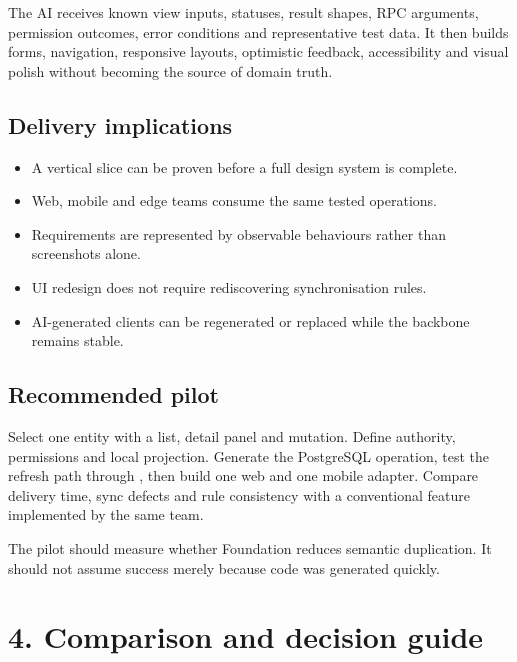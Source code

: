 \documentclass[10pt]{article}
\begin{document}
The AI receives known view inputs, statuses, result shapes, RPC arguments, permission outcomes, error conditions and representative test data. It then builds forms, navigation, responsive layouts, optimistic feedback, accessibility and visual polish without becoming the source of domain truth.

\subsection{Delivery implications}

\begin{itemize}
  \item A vertical slice can be proven before a full design system is complete.
  \item Web, mobile and edge teams consume the same tested operations.
  \item Requirements are represented by observable behaviours rather than screenshots alone.
  \item UI redesign does not require rediscovering synchronisation rules.
  \item AI-generated clients can be regenerated or replaced while the backbone remains stable.
\end{itemize}

\subsection{Recommended pilot}

Select one entity with a list, detail panel and mutation. Define authority, permissions and local projection. Generate the PostgreSQL operation, test the refresh path through , then build one web and one mobile adapter. Compare delivery time, sync defects and rule consistency with a conventional feature implemented by the same team.

The pilot should measure whether Foundation reduces semantic duplication. It should not assume success merely because code was generated quickly.

\newpage
\section{4. Comparison and decision guide}
\end{document}

